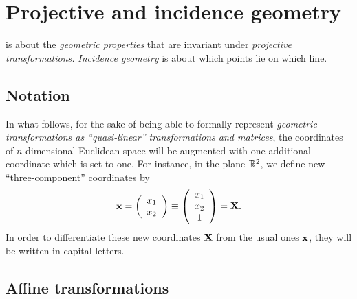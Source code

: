 \chapter{Projective and incidence geometry}
\label{2012-m-ch-projgeom}

 is about the {\em geometric properties} that are invariant under
{\em projective transformations.}
{\em Incidence geometry} is about which points lie on which line.

\section{Notation}
In what follows, for the sake of being able to formally represent {\em geometric transformations as
``quasi-linear'' transformations and matrices},
the coordinates of $n$-dimensional Euclidean space will be augmented with one additional coordinate
which is set to one.
For instance, in the plane ${\Bbb R}^2$, we define new ``three-component'' coordinates by
\begin{equation}
{\bf x} =
\left(
\begin{array}{c}
x_1\\
x_2
\end{array}
\right)
\equiv
\left(
\begin{array}{c}
x_1\\
x_2 \\
1
\end{array}
\right) =  {\bf X}
.
\end{equation}
In order to differentiate these new coordinates ${\bf X}$
from the usual ones ${\bf x}$, they will be written in capital letters.



\section{Affine transformations}

